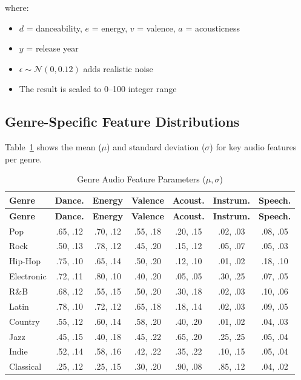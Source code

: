\documentclass[12pt,a4paper]{article}
\begin{document}
where:
\begin{itemize}[noitemsep]
    \item $d$ = danceability, $e$ = energy, $v$ = valence, $a$ = acousticness
    \item $y$ = release year
    \item $\epsilon \sim \mathcal{N}(0, 0.12)$ adds realistic noise
    \item The result is scaled to 0--100 integer range
\end{itemize}

\subsection{Genre-Specific Feature Distributions}

Table~\ref{tab:genre-params} shows the mean ($\mu$) and standard deviation ($\sigma$) for key audio features per genre.

\begin{longtable}{@{}l*{6}{c}@{}}
\caption{Genre Audio Feature Parameters ($\mu, \sigma$)} \label{tab:genre-params} \\
\toprule
\textbf{Genre} & \textbf{Dance.} & \textbf{Energy} & \textbf{Valence} & \textbf{Acoust.} & \textbf{Instrum.} & \textbf{Speech.} \\
\midrule
\endfirsthead
\toprule
\textbf{Genre} & \textbf{Dance.} & \textbf{Energy} & \textbf{Valence} & \textbf{Acoust.} & \textbf{Instrum.} & \textbf{Speech.} \\
\midrule
\endhead
Pop        & .65, .12 & .70, .12 & .55, .18 & .20, .15 & .02, .03 & .08, .05 \\
Rock       & .50, .13 & .78, .12 & .45, .20 & .15, .12 & .05, .07 & .05, .03 \\
Hip-Hop    & .75, .10 & .65, .14 & .50, .20 & .12, .10 & .01, .02 & .18, .10 \\
Electronic & .72, .11 & .80, .10 & .40, .20 & .05, .05 & .30, .25 & .07, .05 \\
R\&B       & .68, .12 & .55, .15 & .50, .20 & .30, .18 & .02, .03 & .10, .06 \\
Latin      & .78, .10 & .72, .12 & .65, .18 & .18, .14 & .02, .03 & .09, .05 \\
Country    & .55, .12 & .60, .14 & .58, .20 & .40, .20 & .01, .02 & .04, .03 \\
Jazz       & .45, .15 & .40, .18 & .45, .22 & .65, .20 & .25, .25 & .05, .04 \\
Indie      & .52, .14 & .58, .16 & .42, .22 & .35, .22 & .10, .15 & .05, .04 \\
Classical  & .25, .12 & .25, .15 & .30, .20 & .90, .08 & .85, .12 & .04, .02 \\
\bottomrule
\end{longtable}
\end{document}
